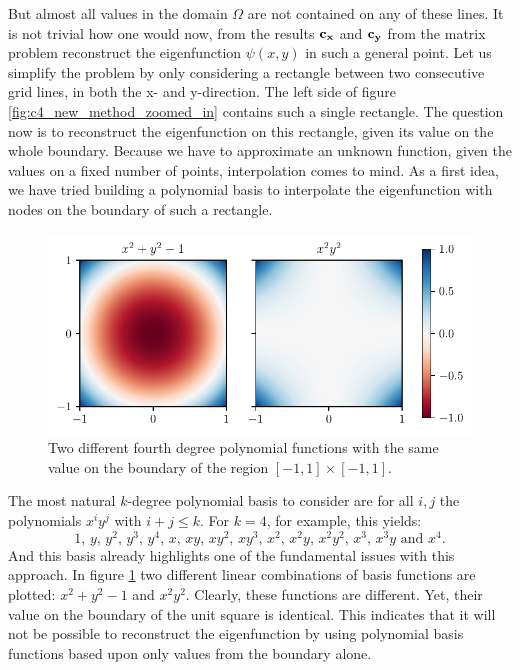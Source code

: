 But almost all values in the domain $\Omega$ are not contained on any of these lines. It is not trivial how one would now, from the results $\vb{c_x}$ and $\vb{c_y}$ from the matrix problem reconstruct the eigenfunction $\psi(x, y)$ in such a general point. Let us simplify the problem by only considering a rectangle between two consecutive grid lines, in both the x- and y-direction. The left side of figure \ref{fig:c4_new_method_zoomed_in} contains such a single rectangle. The question now is to reconstruct the eigenfunction on this rectangle, given its value on the whole boundary. Because we have to approximate an unknown function, given the values on a fixed number of points, interpolation comes to mind. As a first idea, we have tried building a polynomial basis to interpolate the eigenfunction with nodes on the boundary of such a rectangle.

\begin{figure}
    \begin{center}
        \includegraphics[width=1\textwidth]{img/chapter4/nm_interpolation.pdf}
    \end{center}
    \caption{Two different fourth degree polynomial functions with the same value on the boundary of the region $[-1, 1] \times [-1, 1]$.}\label{fig:c4_interpolation_boundary issue}
\end{figure}

The most natural $k$-degree polynomial basis to consider are for all $i, j$ the polynomials $x^i y^j$ with $i + j \leq k$. For $k = 4$, for example, this yields:
$$
    1\text{, } y\text{, } y^2\text{, } y^3\text{, } y^4\text{, } x\text{, } x y\text{, } x y^2\text{, } x y^3\text{, } x^2\text{, } x^2 y\text{, } x^2 y^2\text{, } x^3\text{, } x^3 y\text{ and } x^4\text{.}
$$
And this basis already highlights one of the fundamental issues with this approach. In figure \ref{fig:c4_interpolation_boundary issue} two different linear combinations of basis functions are plotted: $x^2 + y^2 -1$ and $x^2y^2$. Clearly, these functions are different. Yet, their value on the boundary of the unit square is identical. This indicates that it will not be possible to reconstruct the eigenfunction by using polynomial basis functions based upon only values from the boundary alone.


